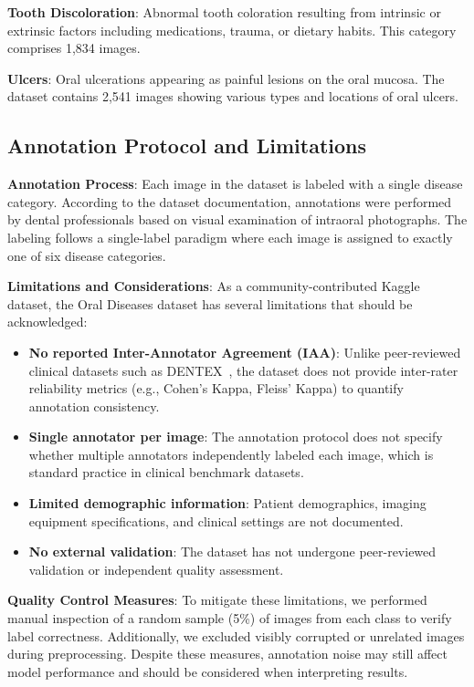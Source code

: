 \textbf{Tooth Discoloration}: Abnormal tooth coloration resulting from intrinsic or extrinsic factors including medications, trauma, or dietary habits. This category comprises 1,834 images.

\textbf{Ulcers}: Oral ulcerations appearing as painful lesions on the oral mucosa. The dataset contains 2,541 images showing various types and locations of oral ulcers.

\subsection{Annotation Protocol and Limitations}

\textbf{Annotation Process}: Each image in the dataset is labeled with a single disease category. According to the dataset documentation, annotations were performed by dental professionals based on visual examination of intraoral photographs. The labeling follows a single-label paradigm where each image is assigned to exactly one of six disease categories.

\textbf{Limitations and Considerations}: As a community-contributed Kaggle dataset, the Oral Diseases dataset has several limitations that should be acknowledged:

\begin{itemize}
    \item \textbf{No reported Inter-Annotator Agreement (IAA)}: Unlike peer-reviewed clinical datasets such as DENTEX~\cite{hamamci2023dentex}, the dataset does not provide inter-rater reliability metrics (e.g., Cohen's Kappa, Fleiss' Kappa) to quantify annotation consistency.
    \item \textbf{Single annotator per image}: The annotation protocol does not specify whether multiple annotators independently labeled each image, which is standard practice in clinical benchmark datasets.
    \item \textbf{Limited demographic information}: Patient demographics, imaging equipment specifications, and clinical settings are not documented.
    \item \textbf{No external validation}: The dataset has not undergone peer-reviewed validation or independent quality assessment.
\end{itemize}

\textbf{Quality Control Measures}: To mitigate these limitations, we performed manual inspection of a random sample (5\%) of images from each class to verify label correctness. Additionally, we excluded visibly corrupted or unrelated images during preprocessing. Despite these measures, annotation noise may still affect model performance and should be considered when interpreting results.

